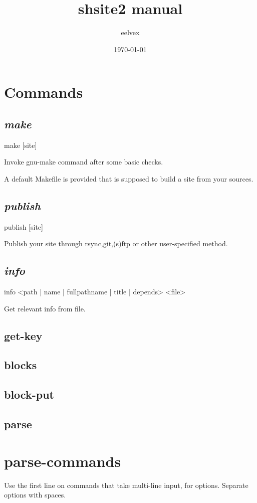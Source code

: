 \documentclass{memoir}
\title{shsite2 manual}
\author{eelvex}
\date{\today}
\begin{document}
\begin{titlingpage}
\maketitle
\end{titlingpage}
\tableofcontents

\chapter{Commands} %

	\section{\emph{make}} %
	make [site]

	Invoke gnu-make command after some basic checks.

	A default Makefile is provided that is supposed to build a site from your sources.
	\section{\emph{publish}} %
	publish [site]

	Publish your site through rsync,git,(s)ftp or other user-specified method.
	\section{\emph{info}}
	info <path | name | fullpathname | title | depends> <file>

	Get relevant info from file.
	\section{get-key}
	\section{blocks}
	\section{block-put}
	\section{parse}


\chapter{parse-commands} %
	Use the first line on commands that take multi-line input, for options.
	Separate options with spaces.
\end{document}
